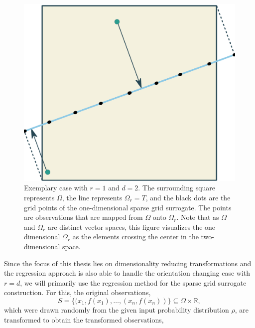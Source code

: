 \documentclass[
  a4paper,  %
  twoside,  %
  bibliography=totoc,
  headsepline,
  cleardoublepage=empty,
  parskip=half,
  draft=false
]{scrbook}
\begin{document}
\begin{mdframed}[style=style]
\begin{figure}[H]
        \centering
\begin{minipage}{.5\textwidth}
        \centering
  \caption{Exemplary case with $r=1$ and $d=2$.
  The surrounding \beige square represents $\Omega$, the \lightblue line represents $\Omega_r=T$, and the black dots are the grid points of the one-dimensional sparse grid surrogate.
The \green points are observations that are mapped from $\Omega$ onto $\Omega_r$.
Note that as $\Omega$ and $\Omega_r$ are distinct vector spaces, this figure visualizes the one dimensional $\Omega_r$ as the elements crossing the center in the two-dimensional space.}
\label{fig:reduced_grid}
    \end{minipage}%
    \begin{minipage}{0.5\textwidth}
        \centering
   \includegraphics[width=0.85\linewidth]{graphics/reduced_grid}
    \end{minipage}
\end{figure}
\end{mdframed}
%
Since the focus of this thesis lies on dimensionality reducing transformations and the regression approach is also able to handle the orientation changing case with $r=d$, we will primarily use the regression method for the sparse grid surrogate construction.
For this, the original observations,
\begin{equation}
S =\{(x_1, f(x_1), \dots, (x_n, f(x_n))\} \subseteq \Omega \times \mathds{R},
\end{equation}
which were drawn randomly from the given input probability distribution $\rho$, are transformed to obtain the transformed observations,
\end{document}
